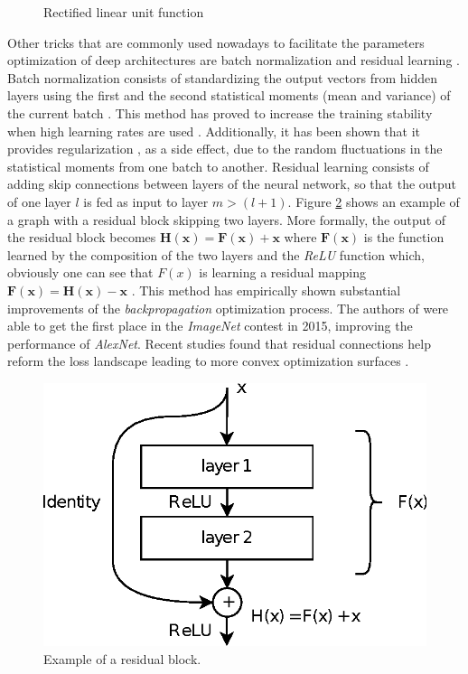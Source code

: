 \begin{figure}
	\centering

	\caption{Rectified linear unit function}
	\label{fig:relu}
\end{figure}

Other tricks that are commonly used nowadays to facilitate the parameters optimization of deep architectures are batch normalization \cite{ioffe2015} and residual learning \cite{kaiming2016}. Batch normalization consists of standardizing the output vectors from hidden layers using the first and the second statistical moments (mean and variance) of the current batch \cite{ioffe2015}. This method has proved to increase the training stability when high learning rates are used \cite{Goodfellow2016}. Additionally, it has been shown that it provides regularization \cite{dauphin2021}, as a side effect, due to the random fluctuations in the statistical moments from one batch to another. Residual learning consists of adding skip connections between layers of the neural network, so that the output of one layer $l$ is fed as input to layer $m > (l+1)$. Figure \ref{fig:residual} shows an example of a graph with a residual block skipping two layers. More formally, the output of the residual block becomes $\mathbf{H(x)} = \mathbf{F(x)} + \mathbf{x}$ where $\mathbf{F(x)}$ is the function learned by the composition of the two layers and the \textit{ReLU} function which, obviously one can see that $F(x)$ is learning a residual mapping $\mathbf{F(x)} = \mathbf{H(x)} - \mathbf{x}$ \cite{kaiming2016}. This method has empirically shown substantial improvements of the \textit{backpropagation} optimization process. The authors of \cite{kaiming2016} were able to get the first place in the \textit{ImageNet} contest in 2015, improving the performance of \textit{AlexNet}. Recent studies found that residual connections help reform the loss landscape leading to more convex optimization surfaces \cite{freeman2017, wang2020}.


\begin{figure}
	\centering
	\includegraphics[width=0.5\linewidth]{chapter2/images/residual}
	\caption{Example of a residual block.}
	\label{fig:residual}
\end{figure}


